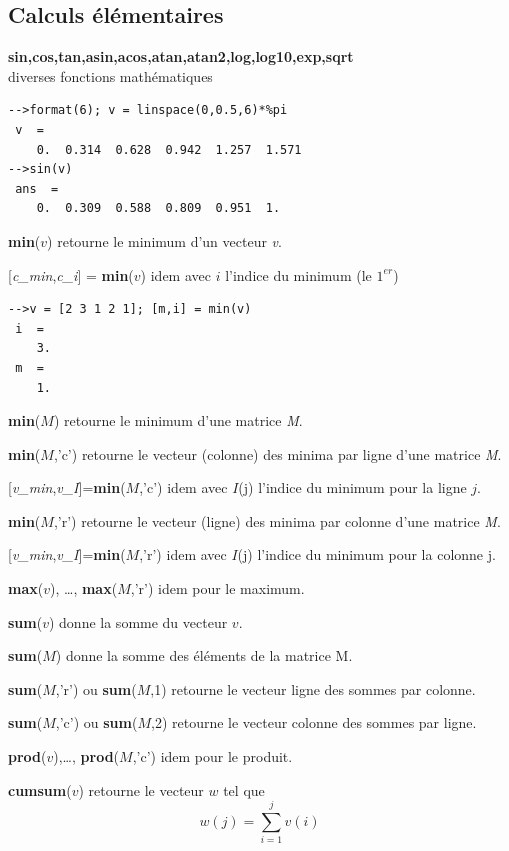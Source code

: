 \documentclass{article}
\begin{document}
\begin{multicols}{3}
\subsection{Calculs élémentaires}
\begin{description}
\item{\textbf{sin,cos,tan,asin,acos,atan,atan2,log,log10,exp,sqrt}}\\
diverses fonctions mathématiques
\begin{verbatim}
-->format(6); v = linspace(0,0.5,6)*%pi
 v  =
    0.  0.314  0.628  0.942  1.257  1.571  
-->sin(v)
 ans  =
    0.  0.309  0.588  0.809  0.951  1.
\end{verbatim}
\item{\textbf{min}($v$)} retourne le minimum d'un vecteur \textit{v}.
\item{[\textit{c\_min},\textit{c\_i}] = \textbf{min}($v$)} idem avec $i$ l'indice du minimum (le $1^{er}$)
\begin{verbatim}
-->v = [2 3 1 2 1]; [m,i] = min(v)
 i  =
    3.  
 m  =
    1. 
\end{verbatim}
\item{\textbf{min}($M$)} retourne le minimum d'une matrice \textit{M}.
\item{\textbf{min}($M$,'c')} retourne le vecteur (colonne) des minima par ligne d'une matrice \textit{M}.
\item{[\textit{v\_min},\textit{v\_I}]=\textbf{min}($M$,'c')} idem avec $I$(j) l'indice du minimum pour la ligne $j$.
\item{\textbf{min}($M$,'r')} retourne le vecteur (ligne) des minima par colonne d'une matrice \textit{M}.
\item{[\textit{v\_min},\textit{v\_I}]=\textbf{min}($M$,'r')} idem avec $I$(j) l'indice du minimum pour la colonne j.
\item{\textbf{max}($v$), \ldots, \textbf{max}($M$,'r')} idem pour le maximum.
\item{\textbf{sum}($v$)} donne la somme du vecteur $v$.
\item{\textbf{sum}($M$)} donne la somme des éléments de la matrice M.
\item{\textbf{sum}($M$,'r') ou \textbf{sum}($M$,1)} retourne le vecteur ligne des sommes par colonne.
\item{\textbf{sum}($M$,'c') ou \textbf{sum}($M$,2)} retourne le vecteur colonne des sommes par ligne.
\item{\textbf{prod}($v$),\ldots, \textbf{prod}($M$,'c')} idem pour le produit.
\item{\textbf{cumsum}($v$)} retourne le vecteur $w$ tel que $$w(j) = \sum_{i=1}^{j} v(i)$$ 

\end{description}
\end{multicols}
\end{document}
